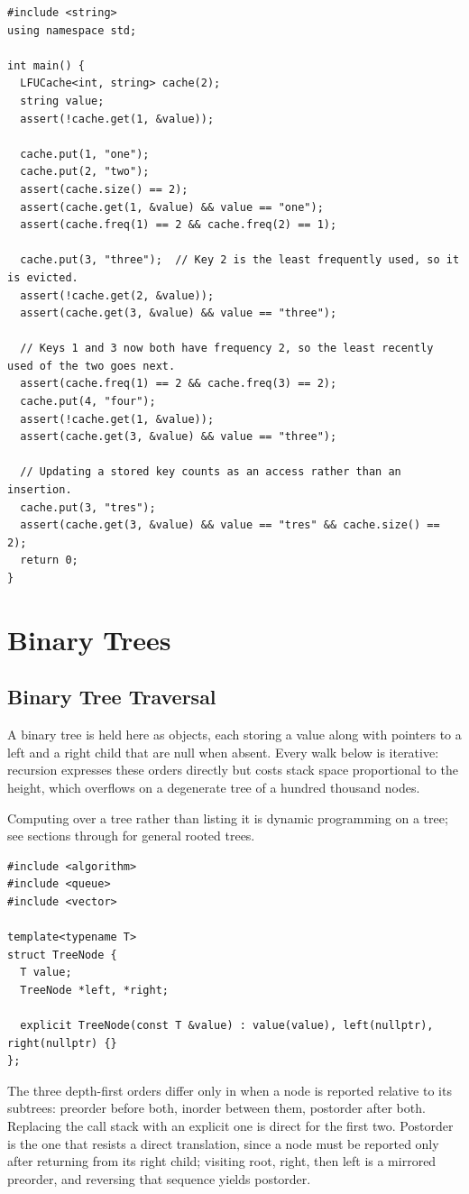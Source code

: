 \begin{lstlisting}[style=cpp]
#include <string>
using namespace std;

int main() {
  LFUCache<int, string> cache(2);
  string value;
  assert(!cache.get(1, &value));

  cache.put(1, "one");
  cache.put(2, "two");
  assert(cache.size() == 2);
  assert(cache.get(1, &value) && value == "one");
  assert(cache.freq(1) == 2 && cache.freq(2) == 1);

  cache.put(3, "three");  // Key 2 is the least frequently used, so it is evicted.
  assert(!cache.get(2, &value));
  assert(cache.get(3, &value) && value == "three");

  // Keys 1 and 3 now both have frequency 2, so the least recently used of the two goes next.
  assert(cache.freq(1) == 2 && cache.freq(3) == 2);
  cache.put(4, "four");
  assert(!cache.get(1, &value));
  assert(cache.get(3, &value) && value == "three");

  // Updating a stored key counts as an access rather than an insertion.
  cache.put(3, "tres");
  assert(cache.get(3, &value) && value == "tres" && cache.size() == 2);
  return 0;
}
\end{lstlisting}

\section{\texorpdfstring{Binary Trees}{2.2 Binary Trees}}
\setcounter{section}{2}
\setcounter{subsection}{0}
\subsection{Binary Tree Traversal}
\label{sec:2.2.1}
A binary tree is held here as  objects, each storing a value along with pointers to a left and a right child that are null when absent. Every walk below is iterative: recursion expresses these orders directly but costs stack space proportional to the height, which overflows on a degenerate tree of a hundred thousand nodes.

Computing over a tree rather than listing it is dynamic programming on a tree; see sections  through  for general rooted trees.

\begin{lstlisting}[style=cpp]
#include <algorithm>
#include <queue>
#include <vector>

template<typename T>
struct TreeNode {
  T value;
  TreeNode *left, *right;

  explicit TreeNode(const T &value) : value(value), left(nullptr), right(nullptr) {}
};
\end{lstlisting}
The three depth-first orders differ only in when a node is reported relative to its subtrees: preorder before both, inorder between them, postorder after both. Replacing the call stack with an explicit one is direct for the first two. Postorder is the one that resists a direct translation, since a node must be reported only after returning from its right child; visiting root, right, then left is a mirrored preorder, and reversing that sequence yields postorder.

